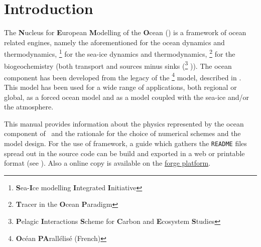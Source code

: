 
\chapter*{Introduction}






The \textbf{N}ucleus for \textbf{E}uropean \textbf{M}odelling of the \textbf{O}cean (\NEMO) is
a framework of ocean related engines, namely the aforementioned for
the ocean dynamics and thermodynamics,
\SIcube \footnote{\textbf{S}ea-\textbf{I}ce modelling \textbf{I}ntegrated \textbf{I}nitiative}
for the sea-ice dynamics and thermodynamics,
\TOP \footnote{\textbf{T}racer in the \textbf{O}cean \textbf{P}aradigm} for
the biogeochemistry (both transport and sources minus sinks
(\PISCES \footnote{
  \textbf{P}elagic \textbf{I}nteractions \textbf{S}cheme for
  \textbf{C}arbon and \textbf{E}cosystem \textbf{S}tudies
}
)).
The ocean component has been developed from the legacy of
the \OPA \footnote{\textbf{O}c\'{e}an \textbf{PA}rall\'{e}lis\'{e} (French)}
model, described in \citet{madec.delecluse.ea_NPM98}.
This model has been used for a wide range of applications, both regional or global,
as a forced ocean model and as a model coupled with the sea-ice and/or the atmosphere.

This manual provides information about the physics represented by the ocean component of \NEMO\ and
the rationale for the choice of numerical schemes and the model design.
For the use of framework,
a guide which gathers the \texttt{README} files spread out in the source code can be build and
exported in a web or printable format (see ).
Also a online copy is available on the \href{http://forge.ipsl.jussieu.fr/nemo}{forge platform}.

